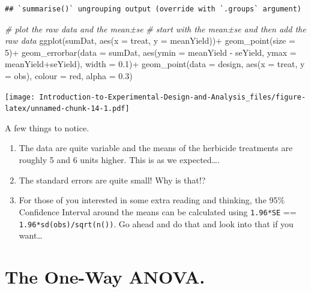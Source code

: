 \documentclass[
]{book}
\newenvironment{Shaded}{\begin{snugshade}}{\end{snugshade}}
\newcommand{\AttributeTok}[1]{\textcolor[rgb]{0.77,0.63,0.00}{#1}}
\newcommand{\CommentTok}[1]{\textcolor[rgb]{0.56,0.35,0.01}{\textit{#1}}}
\newcommand{\DecValTok}[1]{\textcolor[rgb]{0.00,0.00,0.81}{#1}}
\newcommand{\FloatTok}[1]{\textcolor[rgb]{0.00,0.00,0.81}{#1}}
\newcommand{\FunctionTok}[1]{\textcolor[rgb]{0.00,0.00,0.00}{#1}}
\newcommand{\NormalTok}[1]{#1}
\newcommand{\SpecialCharTok}[1]{\textcolor[rgb]{0.00,0.00,0.00}{#1}}
\newcommand{\StringTok}[1]{\textcolor[rgb]{0.31,0.60,0.02}{#1}}
\providecommand{\tightlist}{%
  \setlength{\itemsep}{0pt}\setlength{\parskip}{0pt}}
\begin{document}
\begin{verbatim}
## `summarise()` ungrouping output (override with `.groups` argument)
\end{verbatim}

\begin{Shaded}
\begin{Highlighting}[]
\CommentTok{\# plot the raw data and the mean±se}
\CommentTok{\# start with the mean±se and then add the raw data}
\FunctionTok{ggplot}\NormalTok{(sumDat, }\FunctionTok{aes}\NormalTok{(}\AttributeTok{x =}\NormalTok{ treat, }\AttributeTok{y =}\NormalTok{ meanYield))}\SpecialCharTok{+}
  \FunctionTok{geom\_point}\NormalTok{(}\AttributeTok{size =} \DecValTok{5}\NormalTok{)}\SpecialCharTok{+}
  \FunctionTok{geom\_errorbar}\NormalTok{(}\AttributeTok{data =}\NormalTok{ sumDat, }\FunctionTok{aes}\NormalTok{(}\AttributeTok{ymin =}\NormalTok{ meanYield }\SpecialCharTok{{-}}\NormalTok{ seYield, }\AttributeTok{ymax =}\NormalTok{ meanYield}\SpecialCharTok{+}\NormalTok{seYield),}
                \AttributeTok{width =} \FloatTok{0.1}\NormalTok{)}\SpecialCharTok{+}
  \FunctionTok{geom\_point}\NormalTok{(}\AttributeTok{data =}\NormalTok{ design, }\FunctionTok{aes}\NormalTok{(}\AttributeTok{x =}\NormalTok{ treat, }\AttributeTok{y =}\NormalTok{ obs), }\AttributeTok{colour =} \StringTok{\textquotesingle{}red\textquotesingle{}}\NormalTok{, }\AttributeTok{alpha =} \FloatTok{0.3}\NormalTok{)}
\end{Highlighting}
\end{Shaded}

\texttt{[image: Introduction-to-Experimental-Design-and-Analysis\_files/figure-latex/unnamed-chunk-14-1.pdf]}

A few things to notice.

\begin{enumerate}
\def\labelenumi{\arabic{enumi}.}
\tightlist
\item
  The data are quite variable and the means of the herbicide treatments are roughly 5 and 6 units higher. This is as we expected\ldots.
\item
  The standard errors are quite small! Why is that!?
\item
  For those of you interested in some extra reading and thinking, the 95\% Confidence Interval around the means can be calculated using \texttt{1.96*SE} == \texttt{1.96*sd(obs)/sqrt(n())}. Go ahead and do that and look into that if you want\ldots{}
\end{enumerate}

\hypertarget{the-one-way-anova.}{%
\section{The One-Way ANOVA.}\label{the-one-way-anova.}}
\end{document}
